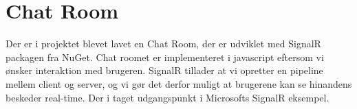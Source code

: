 \section{Chat Room}
Der er i projektet blevet lavet en Chat Room, der er udviklet med SignalR packagen fra NuGet. Chat roomet er implementeret i javascript eftersom vi ønsker interaktion med brugeren. SignalR tillader at vi opretter en pipeline mellem client og server, og vi gør det derfor muligt at brugerene kan se hinandens beskeder real-time. Der i taget udgangspunkt i Microsofts SignalR eksempel.  \cite{signalr}


